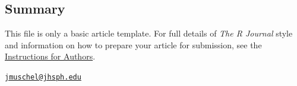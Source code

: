 \hypertarget{summary}{%
\subsection{Summary}\label{summary}}

This file is only a basic article template. For full details of
\emph{The R Journal} style and information on how to prepare your
article for submission, see the
\href{https://journal.r-project.org/share/author-guide.pdf}{Instructions
for Authors}.




\address{%
John Muschelli\\
Department of Biostatistics, Johns Hopkins Bloomberg School of Public
Health\\
615 N Wolfe St Baltimore, MD 21205\\
}
\href{mailto:jmuschel@jhsph.edu}{\nolinkurl{jmuschel@jhsph.edu}}

